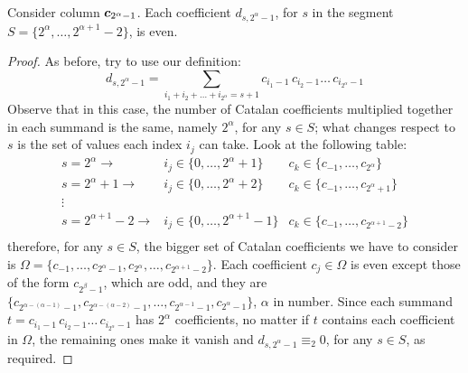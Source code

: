 \begin{theorem}
    Consider column $\boldsymbol{c}_{2^{\alpha}-1}$. 
    Each coefficient $d_{s,2^{\alpha}-1}$, for $s$ in the segment 
    $S=\lbrace2^{\alpha},\ldots,2^{\alpha+1}-2\rbrace$, is even.
\end{theorem}

\begin{proof}
As before, try to use our definition:
\begin{displaymath}
    d_{s, 2^{\alpha}-1} = \sum_{i_{1}+i_{2}+\ldots+i_{2^{\alpha}}=s+1}
        {c_{i_{1}-1}\,c_{i_{2}-1}\ldots\,c_{i_{2^{\alpha}}-1}}
\end{displaymath}
Observe that in this case, the number of Catalan coefficients
multiplied together in each summand is the same, namely $2^{\alpha}$,
for any $s\in S$; what changes respect to $s$ is the set of values 
each index $i_{j}$ can take. Look at the following table:
\begin{displaymath}
    \begin{array}{rcc}
        s = 2^{\alpha} \rightarrow
            & i_{j}\in\lbrace0,\ldots,2^{\alpha}+1\rbrace 
            & c_{k}\in\lbrace c_{-1},\ldots,c_{2^{\alpha}}\rbrace\\
        s = 2^{\alpha} +1\rightarrow
            & i_{j}\in\lbrace0,\ldots,2^{\alpha}+2\rbrace 
            & c_{k}\in\lbrace c_{-1},\ldots,c_{2^{\alpha}+1}\rbrace\\
        \vdots & & \\
        s = 2^{\alpha+1} -2\rightarrow
            & i_{j}\in\lbrace0,\ldots,2^{\alpha+1}-1\rbrace 
            & c_{k}\in\lbrace c_{-1},\ldots,c_{2^{\alpha+1}-2}\rbrace\\
    \end{array}
\end{displaymath}
therefore, for any $s\in S$, the bigger set of Catalan coefficients we have 
to consider is $\Omega = \lbrace c_{-1},\ldots,c_{2^{\alpha}-1},c_{2^{\alpha}},\ldots,c_{2^{\alpha+1}-2}\rbrace$.
Each coefficient $c_{j}\in\Omega$ is even except those of the form $c_{2^{\beta}-1}$, which are odd,
and they are $\lbrace c_{2^{\alpha-(\alpha-1)}-1},c_{2^{\alpha-(\alpha-2)}-1},\ldots, 
    c_{2^{\alpha-1}-1},c_{2^{\alpha}-1}\rbrace$, $\alpha$ in number.
Since each summand $t=c_{i_{1}-1}\,c_{i_{2}-1}\ldots\,c_{i_{2^{\alpha}}-1}$ 
has $2^{\alpha}$ coefficients, no matter if $t$ contains each coefficient in $\Omega$,
the remaining ones make it vanish and $ d_{s, 2^{\alpha}-1} \equiv_{2} 0$, for any $s\in S$,
as required.

\end{proof}

